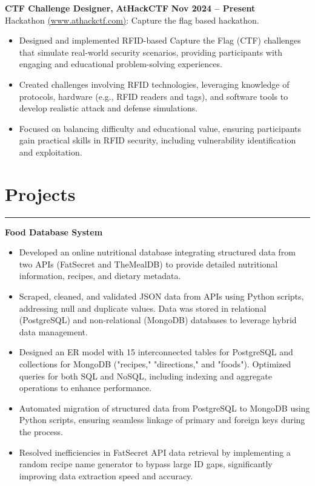 \documentclass[10pt]{article}
\begin{document}
\textbf{CTF Challenge Designer, } \hfill \textbf{AtHackCTF} \hfill \textbf{Nov 2024 -- Present} \\
{Hackathon {\href{https://www.athackctf.com}{(www.athackctf.com)}: Capture the flag based hackathon.}}
\vspace{-4mm}
\begin{itemize}[left=0.15in, itemsep=0pt]
    \item Designed and implemented RFID-based Capture the Flag (CTF) challenges that simulate real-world security scenarios, providing participants with engaging and educational problem-solving experiences.
    \item Created challenges involving RFID technologies, leveraging knowledge of protocols, hardware (e.g., RFID readers and tags), and software tools to develop realistic attack and defense simulations.
    \item Focused on balancing difficulty and educational value, ensuring participants gain practical skills in RFID security, including vulnerability identification and exploitation.
\end{itemize}

\section*{Projects}
\vspace{-2mm}
\hrule
\vspace{0mm}

\textbf{Food Database System}
\vspace{-4mm}
\begin{itemize}[left=0.15in, itemsep=0pt, label=--]
    \item Developed an online nutritional database integrating structured data from two APIs (FatSecret and TheMealDB) to provide detailed nutritional information, recipes, and dietary metadata.
    \item Scraped, cleaned, and validated JSON data from APIs using Python scripts, addressing null and duplicate values. Data was stored in relational (PostgreSQL) and non-relational (MongoDB) databases to leverage hybrid data management.
    \item Designed an ER model with 15 interconnected tables for PostgreSQL and collections for MongoDB ("recipes," "directions," and "foods"). Optimized queries for both SQL and NoSQL, including indexing and aggregate operations to enhance performance.
    \item Automated migration of structured data from PostgreSQL to MongoDB using Python scripts, ensuring seamless linkage of primary and foreign keys during the process.
    \item Resolved inefficiencies in FatSecret API data retrieval by implementing a random recipe name generator to bypass large ID gaps, significantly improving data extraction speed and accuracy.
\end{itemize}
\end{document}
